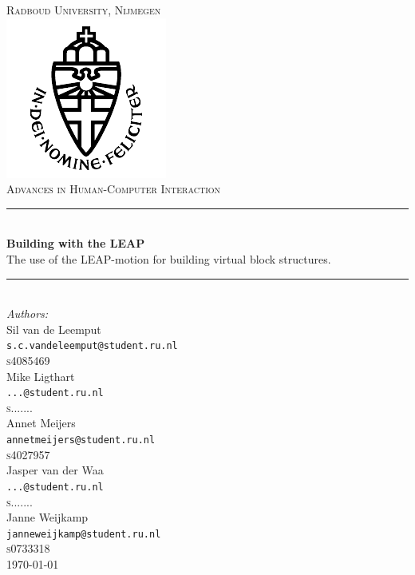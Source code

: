 \newcommand{\HRule}{\rule{\linewidth}{0.5mm}}

\begin{titlepage}

\begin{center}



\textsc{\LARGE Radboud University, Nijmegen}\\

\includegraphics[scale=0.8]{imgs/rulogo.png}\\[1cm]

\textsc{\Large Advances in Human-Computer Interaction}\\[0.5cm]



\HRule \\[0.4cm]
{ \huge \bfseries Building with the LEAP}\\[0.3cm]
{\Large The use of the LEAP-motion for building virtual block structures.}

\HRule \\[1cm]

{\large \emph{Authors:}\\[0.2cm]
Sil van de Leemput\\
\texttt{s.c.vandeleemput@student.ru.nl}\\[0.08cm]
\textsc{s4085469}\\[0.5cm]
Mike Ligthart\\
\texttt{...@student.ru.nl}\\[0.08cm]
\textsc{s.......}\\[0.5cm]
Annet Meijers\\
\texttt{annetmeijers@student.ru.nl}\\[0.08cm]
\textsc{s4027957}\\[0.5cm]
Jasper van der Waa\\
\texttt{...@student.ru.nl}\\[0.08cm]
\textsc{s.......}\\[0.5cm]
Janne Weijkamp\\
\texttt{janneweijkamp@student.ru.nl}\\[0.08cm]
\textsc{s0733318}}\\[2cm]
\today
\end{center}

\end{titlepage}